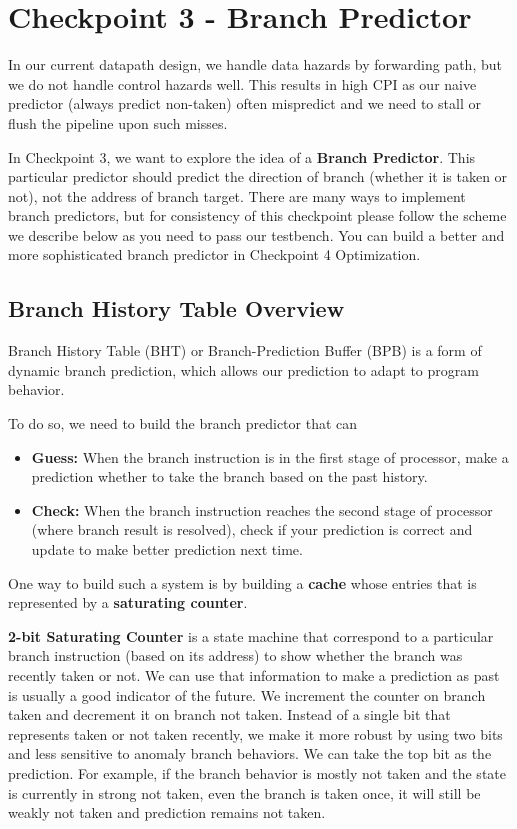 \section{Checkpoint 3 - Branch Predictor}
In our current datapath design, we handle data hazards by forwarding path, but we do not handle control hazards well. This results in high CPI as our naive predictor (always predict non-taken) often mispredict and we need to stall or flush the pipeline upon such misses. 

In Checkpoint 3, we want to explore the idea of a \textbf{Branch Predictor}. This particular predictor should predict the direction of branch (whether it is taken or not), not the address of branch target. There are many ways to implement branch predictors, but for consistency of this checkpoint please follow the scheme we describe below as you need to pass our testbench. You can build a better and more sophisticated branch predictor in Checkpoint 4 Optimization. 

\subsection{Branch History Table Overview}
Branch History Table (BHT) or Branch-Prediction Buffer (BPB) is a form of dynamic branch prediction, which allows our prediction to adapt to program behavior.  

To do so, we need to build the branch predictor that can 
\begin{itemize}
    \item \textbf{Guess:} When the branch instruction is in the first stage of processor, make a prediction whether to take the branch based on the past history.
    \item \textbf{Check:} When the branch instruction reaches the second stage of processor (where branch result is resolved), check if your prediction is correct and update to make better prediction next time.
\end{itemize}

One way to build such a system is by building a \textbf{cache} whose entries that is represented by a \textbf{saturating counter}. 

\textbf{2-bit Saturating Counter} is a state machine that correspond to a particular branch instruction (based on its address) to show whether the branch was recently taken or not. We can use that information to make a prediction as past is usually a good indicator of the future. We increment the counter on branch taken and decrement it on branch not taken. Instead of a single bit that represents taken or not taken recently, we make it more robust by using two bits and less sensitive to anomaly branch behaviors. We can take the top bit as the prediction. For example, if the branch behavior is mostly not taken and the state is currently in strong not taken, even the branch is taken once, it will still be weakly not taken and prediction remains not taken. 

